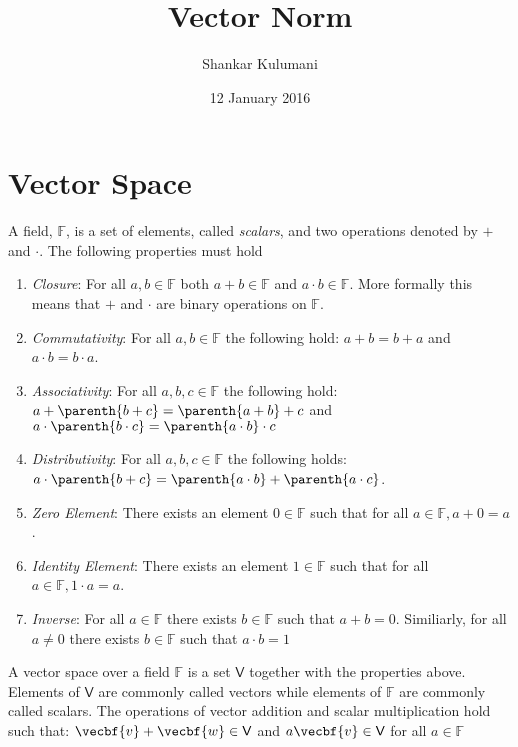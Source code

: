 \documentclass[11pt, reqno]{article}   	%
\title{Vector Norm}
\author{Shankar Kulumani}
\date{12 January 2016}
\newcommand{\F}{\mathbb{F}}
\newcommand{\V}{\mathsf{V}}
\begin{document}
\maketitle
\section{Vector Space}

\begin{definition}
	A field, \( \F \), is a set of elements, called \emph{scalars}, and two operations denoted by \( +\) and \( \cdot\).
	The following properties must hold
	\begin{enumerate}
		\item \emph{Closure}: For all \( a, b \in \F \) both \( a + b \in \F \) and \( a \cdot b \in \F \).
			More formally this means that \( + \) and \( \cdot \) are binary operations on \( \F \).
		\item \emph{Commutativity}: For all \( a, b \in \F \) the following hold: \( a + b = b+a \) and \( a \cdot b = b \cdot a\).
		\item \emph{Associativity}: For all \( a, b, c \in \F \) the following hold: \( a + \parenth{b + c} = \parenth{a + b} + c\) and \( a \cdot \parenth{b \cdot c} = \parenth{a \cdot b} \cdot c\)
		\item \emph{Distributivity}: For all \( a, b, c \in \F\) the following holds: \( a \cdot \parenth{b+c} = \parenth{a\cdot b} + \parenth{a \cdot c} \).
		\item \emph{Zero Element}: There exists an element \( 0 \in \F \) such that for all \( a \in \F, a + 0 = a \).
		\item \emph{Identity Element}: There exists an element \( 1 \in \F \) such that for all \( a \in \F, 1 \cdot a = a \).
		\item \emph{Inverse}: For all \( a \in \F \) there exists \( b \in \F \) such that \( a + b = 0 \). 
			Similiarly, for all \( a \neq 0\) there exists \( b \in \F \) such that \( a \cdot b = 1 \)
	\end{enumerate}
\end{definition}

A vector space over a field \( \F \) is a set \( \V \) together with the properties above. 
Elements of \( \V \) are commonly called vectors while elements of \( \F \) are commonly called scalars.
The operations of vector addition and scalar multiplication hold such that: \( \vecbf{v} + \vecbf{w} \in \V \) and \( a \vecbf{v} \in \V \) for all \( a \in \F \)
\end{document}

